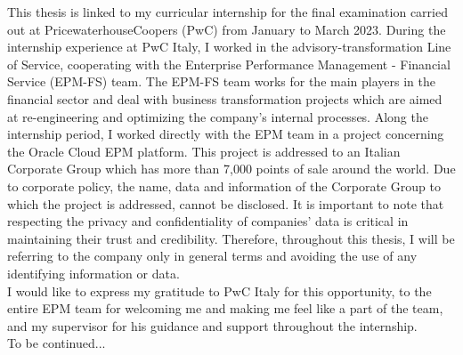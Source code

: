 \documentclass[12pt,a4paper,openright,twoside]{book}
\begin{document}
	
\frontmatter



\begin{acknowledgements}

This thesis is linked to my curricular internship for the final examination carried out at PricewaterhouseCoopers (PwC) from January to March 2023.
%
During the internship experience at PwC Italy, I worked in the advisory-transformation Line of Service, cooperating with the Enterprise Performance Management - Financial Service (EPM-FS) team.
%
The EPM-FS team works for the main players in the financial sector and deal with business transformation projects which are aimed at re-engineering and optimizing the company's internal processes.
%
Along the internship period, I worked directly with the EPM team in a project concerning the Oracle Cloud EPM platform.
%
This project is addressed to an Italian Corporate Group which has more than 7,000 points of sale around the world. 
%
Due to corporate policy, the name, data and information of the Corporate Group to which the project is addressed, cannot be disclosed. 
%
It is important to note that respecting the privacy and confidentiality of companies' data is critical in maintaining their trust and credibility.
%
Therefore, throughout this thesis, I will be referring to the company only in general terms and avoiding the use of any identifying information or data. \\

I would like to express my gratitude to PwC Italy for this opportunity, to the entire EPM team for welcoming me and making me feel like a part of the team, and my supervisor for his guidance and support throughout the internship. \\

To be continued...

\end{acknowledgements}
\end{document}

